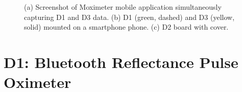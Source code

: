 \begin{figure}
	\begin{center}
	\end{center}
	\caption{(a) Screenshot of Moximeter mobile application simultaneously capturing D1 and D3 data. (b) D1 (green, dashed) and D3 (yellow, solid) mounted on a smartphone phone. (c) D2 board with cover.} 
	\label{fig:designs}
\end{figure} 



\section{D1: Bluetooth Reflectance Pulse Oximeter}
